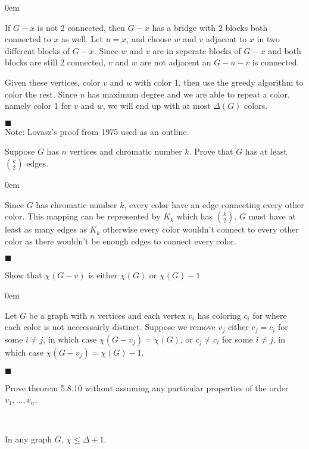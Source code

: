 \documentclass[12pt]{article}
\renewcommand{\qed}{\hfill$\blacksquare$}
\renewenvironment{proof}{\vspace{1em}\begin{addmargin}[2em]{0em}\begin{newproof}}{\end{newproof}\end{addmargin}\qed}
\newenvironment{theorem}[2][Theorem]{\begin{trivlist}
\item[\hskip \labelsep {\bfseries #1} \hskip \labelsep {\bfseries #2.}]}{\end{trivlist}}
\newenvironment{exercise}[2][Exercise]{\begin{trivlist}
\item[\hskip \labelsep {\bfseries #1} \hskip \labelsep {\bfseries #2.}]}{\end{trivlist}}
\begin{document}
\begin{proof}
If $G-x$ is not 2 connected, then $G - x$ has a bridge with 2 blocks both connected to $x$ as well. Let $u = x$, and choose $w$ and $v$ adjacent to $x$ in two different blocks of $G - x$. Since $w$ and $v$ are in seperate blocks of $G - x$ and both blocks are still 2 connected, $v$ and $w$ are not adjacent an $G - u - v$ is connected.

Given these vertices, color $v$ and $w$ with color 1, then use the greedy algorithm to color the rest. Since $u$ has maximum degree and we are able to repeat a color, namely color 1 for $v$ and $w$, we will end up with at most $\Delta(G)$ colors.

\end{proof} \\
Note: Lovasz's proof from 1975 used as an outline.
\begin{exercise}{5.8.1 (2pt)}
	Suppose $G$ has $n$ vertices and chromatic number $k$. Prove that $G$ has at least $\binom{k}{2}$ edges.
\end{exercise}	
\begin{proof}
	Since $G$ has chromatic number $k$, every color have an edge connecting every other color. This mapping can be represented by $K_{k}$ which has $\binom{k}{2}$. $G$ must have at least as many edges as $K_k$ otherwise every color wouldn't connect to every other color as there wouldn't be enough edges to connect every color.  
\end{proof}
\begin{exercise}{5.8.3 (2pt)}
	Show that $\chi(G - v)$ is either $\chi(G)$ or $\chi(G) - 1$
\end{exercise}	
\begin{proof}
	Let $G$ be a graph with $n$ vertices and each vertex $v_i$ has coloring $c_i$ for where each color is not neccessairly distinct. Suppose we remove $v_j$ either $c_j = c_i$ for some $i \neq j$, in which case $\chi(G - v_j) = \chi(G)$, or $c_j \neq c_i$ for some $i \neq j$, in which case $\chi(G - v_j) = \chi(G) - 1$. 
\end{proof}
\begin{exercise}{5.8.4 (2pt)}
	Prove theorem 5.8.10 without assuming any particular properties of the order $v_1,\ldots,v_n$.
\end{exercise}	
\begin{tcolorbox}[colback=blue!10!white,colframe=blue!75!black]
	\begin{theorem}{5.8.10} \
		\begin{center}
			In any graph $G$, $\chi \le \Delta + 1$.
		\end{center}
	\end{theorem}
\end{tcolorbox}
\end{document}
